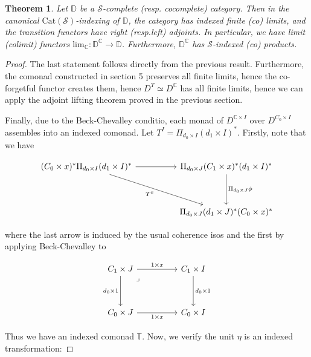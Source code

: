 \documentclass[10pt, oneside]{article}
\newtheorem{theorem}{Theorem}[section]
\begin{document}
\begin{theorem}
	Let $\mathbb{D}$ be a $\mathcal{S}$-complete (resp. cocomplete) category. Then in the canonical $\mathrm{Cat}{(\mathcal{S})}$-indexing of $\mathbb{D}$, the category has indexed finite (co) limits, and the transition functors have right (resp.left) adjoints. In particular, we have limit (colimit) functors $\mathrm{lim}_{\mathbb{C}}: \mathbb{D}^\mathbb{C} \to \mathbb{D}$. Furthermore, $\mathbb{D}^\mathbb{C}$ has $\mathcal{S}$-indexed (co) products.
\end{theorem}
\begin{proof}
	The last statement follows directly from the previous result. Furthermore, the comonad constructed in section 5 preserves all finite limits, hence the co-forgetful functor creates them, hence $D^T \simeq D^\mathbb{C}$ has all finite limits, hence we can apply the adjoint lifting theorem proved in the previous section.
	 
	Finally, due to the Beck-Chevalley conditio, each monad of $D^{\mathbb{C} \times I}$ over $D^{C_0 \times I}$ assembles into an indexed comonad. Let $T^I = \Pi_{d_0 \times I} {(d_1 \times I)}^\ast$. Firstly, note that we have
	
	\[\begin{tikzcd}
		{(C_0 \times x)^\ast \Pi_{d_0 \times I} (d_1 \times I)^\ast} && {\Pi_{d_0 \times J} (C_1 \times x)^\ast (d_1 \times I)^\ast} \\
		\\
		&& {\Pi_{d_0 \times J} (d_1 \times J)^\ast (C_0 \times x)^\ast }
		\arrow[from=1-1, to=1-3]
		\arrow["{\Pi_{d_0 \times J} \phi}", from=1-3, to=3-3]
		\arrow["{T^x}"', from=1-1, to=3-3]
	\end{tikzcd}\]
	
	\noindent where the last arrow is induced by the usual coherence isos and the first by applying Beck-Chevalley to
	
	\[\begin{tikzcd}
		{C_1 \times J} && {C_1 \times I} \\
		\\
		{C_0 \times J} && {C_0 \times I}
		\arrow["{d_0 \times 1}"', from=1-1, to=3-1]
		\arrow["{1 \times x}"', from=3-1, to=3-3]
		\arrow["{d_0 \times 1}", from=1-3, to=3-3]
		\arrow["{1 \times x}", from=1-1, to=1-3]
		\arrow["\lrcorner"{anchor=center, pos=0.125}, draw=none, from=1-1, to=3-3]
	\end{tikzcd}\]
	
	Thus we have an indexed comonad $\mathbb{T}$. Now, we verify the unit $\eta$ is an indexed transformation:
	

\end{proof}
\end{document}
